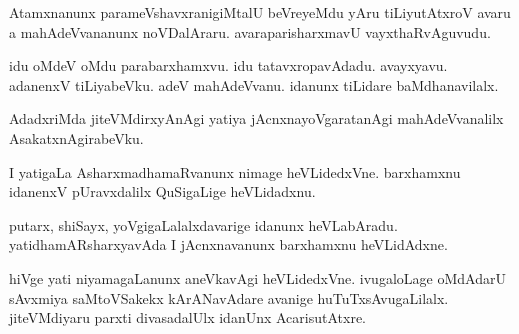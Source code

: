 \documentclass{article}
\begin{document}
\begin{mn}
Atamxnanunx parameVshavxranigiMtalU beVreyeMdu yAru tiLiyutAtxroV avaru a mahAdeVvananunx 
noVDalAraru. avaraparisharxmavU vayxthaRvAguvudu.
\end{mn}

\begin{mn}
idu oMdeV oMdu parabarxhamxvu. idu tatavxropavAdadu. avayxyavu. adanenxV tiLiyabeVku. adeV 
mahAdeVvanu. idanunx tiLidare baMdhanavilalx.
\end{mn}

\begin{mn}
AdadxriMda jiteVMdirxyAnAgi yatiya jAcnxnayoVgaratanAgi mahAdeVvanalilx AsakatxnAgirabeVku.
\end{mn}

\begin{mn}
I yatigaLa AsharxmadhamaRvanunx nimage heVLidedxVne. barxhamxnu idanenxV pUravxdalilx QuSigaLige 
heVLidadxnu.
\end{mn}

\begin{mn}
putarx, shiSayx, yoVgigaLalalxdavarige idanunx heVLabAradu. yatidhamARsharxyavAda I jAcnxnavanunx 
barxhamxnu heVLidAdxne.
\end{mn}

\begin{mn}
hiVge yati niyamagaLanunx aneVkavAgi heVLidedxVne. ivugaloLage oMdAdarU sAvxmiya saMtoVSakekx 
kArANavAdare avanige huTuTxsAvugaLilalx. jiteVMdiyaru parxti divasadalUlx idanUnx AcarisutAtxre.
\end{mn}

\end{document}
